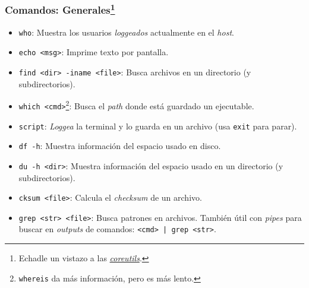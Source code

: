 \documentclass[aspectratio=43]{beamer}
\begin{document}
\begin{frame}
    \frametitle{Comandos: Generales\footnote{Echadle un vistazo a las \href{https://www.maizure.org/projects/decoded-gnu-coreutils/}{\textit{coreutils}}.}}

    \begin{itemize}
        \item \texttt{who}: Muestra los usuarios \textit{loggeados} actualmente en el \textit{host}.
        \item \texttt{echo <msg>}: Imprime texto por pantalla.
        \item \texttt{find <dir> -iname <file>}: Busca archivos en un directorio (y subdirectorios).
        \item \texttt{which <cmd>}\footnote{\texttt{whereis} da más información, pero es más lento.}: Busca el \textit{path} donde está guardado un ejecutable.
        \item \texttt{script}: \textit{Loggea} la terminal y lo guarda en un archivo (usa \texttt{exit} para parar).
        \item \texttt{df -h}: Muestra información del espacio usado en disco.
        \item \texttt{du -h <dir>}: Muestra información del espacio usado en un directorio (y subdirectorios).
        \item \texttt{cksum <file>}: Calcula el \textit{checksum} de un archivo.
        \item \texttt{grep <str> <file>}: Busca patrones en archivos. También útil con \textit{pipes} para buscar en \textit{outputs} de comandos: \texttt{<cmd> | grep <str>}.
    \end{itemize}
\end{frame}
\end{document}
